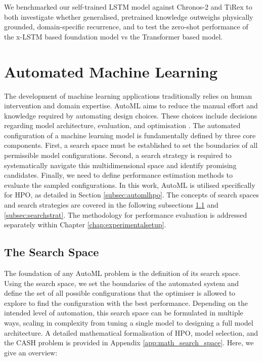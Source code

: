 We benchmarked our self-trained \ac{LSTM} model against Chronos-2 and TiRex to both investigate whether generalised, pretrained knowledge outweighs physically grounded, domain-specific recurrence, and to test the zero-shot performance of the \ac{x-LSTM} based foundation model vs the Transformer based model.
    

\section{Automated Machine Learning}

\label{sec:automl}

The development of machine learning applications traditionally relies on human intervention and domain expertise.
\ac{AutoML} aims to reduce the manual effort and knowledge required by automating design choices.
These choices include decisions regarding model architecture, evaluation, and optimisation \parencite{hutter2019automated}.
The automated configuration of a machine learning model is fundamentally defined by three core components.
First, a search space must be established to set the boundaries of all permissible model configurations.
Second, a search strategy is required to systematically navigate this multidimensional space and identify promising candidates.
Finally, we need to define performance estimation methods to evaluate the sampled configurations.
In this work, \ac{AutoML} is utilised specifically for \ac{HPO}, as detailed in Section \ref{subsec:automlhpo}.
The concepts of search spaces and search strategies are covered in the following subsections \ref{subsec:search_space} and \ref{subsec:searchstrat}. The methodology for performance evaluation is addressed separately within Chapter \ref{chap:experimentalsetup}.

\subsection{The Search Space}
\label{subsec:search_space}

The foundation of any \ac{AutoML} problem is the definition of its search space. Using the search space, we set the boundaries of the automated system and define the set of all possible configurations that the optimiser is allowed to explore to find the configuration with the best performance.
 Depending on the intended level of automation, this search space can be formulated in multiple ways, scaling in complexity from tuning a single model to designing a full model architecture. A detailed mathematical formalisation of \ac{HPO}, model selection, and the \ac{CASH} problem is provided in Appendix \ref{app:math_search_space}. Here, we give an overview:
